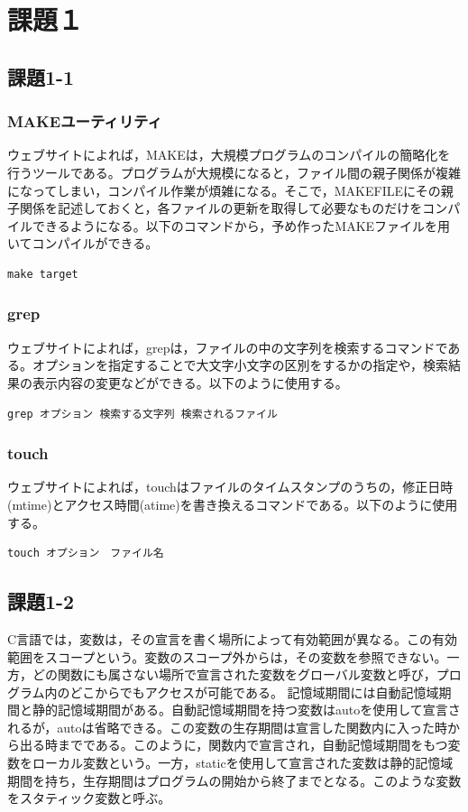 \documentclass[]{jsarticle}
\begin{document}
\section{課題１}
\subsection{課題1-1}
\subsubsection{MAKEユーティリティ}
ウェブサイト\cite{1}によれば，MAKEは，大規模プログラムのコンパイルの簡略化を行うツールである。プログラムが大規模になると，ファイル間の親子関係が複雑になってしまい，コンパイル作業が煩雑になる。そこで，MAKEFILEにその親子関係を記述しておくと，各ファイルの更新を取得して必要なものだけをコンパイルできるようになる。以下のコマンドから，予め作ったMAKEファイルを用いてコンパイルができる。

\begin{lstlisting}[]
make target
\end{lstlisting}

\subsubsection{grep}
ウェブサイト\cite{2}によれば，grepは，ファイルの中の文字列を検索するコマンドである。オプションを指定することで大文字小文字の区別をするかの指定や，検索結果の表示内容の変更などができる。以下のように使用する。

\begin{lstlisting}[]
grep オプション 検索する文字列 検索されるファイル
\end{lstlisting}

\subsubsection{touch}
ウェブサイト\cite{3}によれば，touchはファイルのタイムスタンプのうちの，修正日時(mtime)とアクセス時間(atime)を書き換えるコマンドである。以下のように使用する。

\begin{lstlisting}[]
touch オプション　ファイル名
\end{lstlisting}

\subsection{課題1-2}
C言語では，変数は，その宣言を書く場所によって有効範囲が異なる。この有効範囲をスコープという。変数のスコープ外からは，その変数を参照できない。一方，どの関数にも属さない場所で宣言された変数をグローバル変数と呼び，プログラム内のどこからでもアクセスが可能である。
記憶域期間には自動記憶域期間と静的記憶域期間がある。自動記憶域期間を持つ変数はautoを使用して宣言されるが，autoは省略できる。この変数の生存期間は宣言した関数内に入った時から出る時までである。このように，関数内で宣言され，自動記憶域期間をもつ変数をローカル変数という。一方，staticを使用して宣言された変数は静的記憶域期間を持ち，生存期間はプログラムの開始から終了までとなる。このような変数をスタティック変数と呼ぶ。
\end{document}
